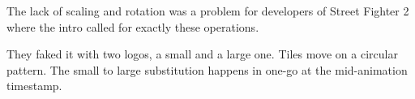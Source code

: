 \begin{minipage}[t]{0.32\linewidth}
\end{minipage}%
\hfill%
\begin{minipage}[t]{0.32\linewidth}
\end{minipage}
\hfill%
\begin{minipage}[t]{0.32\linewidth}
\end{minipage}

\begin{minipage}[t]{0.32\linewidth}
\end{minipage}%
\hfill%
\begin{minipage}[t]{0.32\linewidth}
\end{minipage}
\hfill%
\begin{minipage}[t]{0.32\linewidth}
\end{minipage}

\begin{minipage}[t]{0.32\linewidth}
\end{minipage}%
\hfill%
\begin{minipage}[t]{0.32\linewidth}
\end{minipage}
\hfill%
\begin{minipage}[t]{0.32\linewidth}
\end{minipage}

\begin{minipage}[t]{0.32\linewidth}
\end{minipage}%
\hfill%
\begin{minipage}[t]{0.32\linewidth}
\end{minipage}
\hfill%
\begin{minipage}[t]{0.32\linewidth}
\end{minipage}

The lack of scaling and rotation was a problem for developers of Street Fighter 2 where the intro called for exactly these operations. 

They faked it with two logos, a small and a large one. Tiles move on a circular pattern. The small to large substitution happens in one-go at the mid-animation timestamp.

\pagebreak











